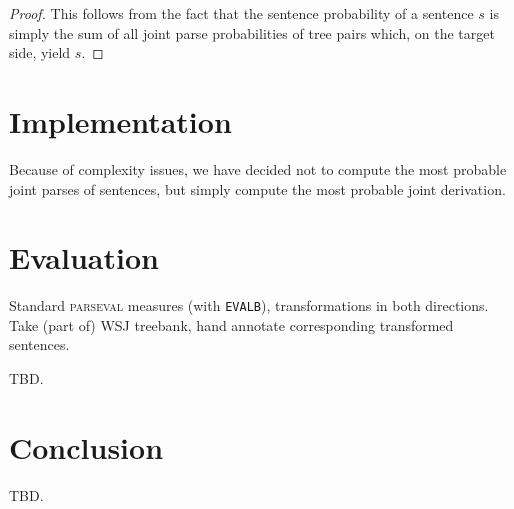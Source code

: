 \documentclass[a4paper]{article}
\theoremstyle{definition}
\begin{document}
\begin{proof}
This follows from the fact that the sentence probability of a sentence $s$ is simply the sum of all joint parse probabilities of tree pairs which, on the target side, yield $s$.
\end{proof}

\section{Implementation}

Because of complexity issues, we have decided not to compute the most probable joint parses of sentences, but simply compute the most probable joint derivation.

\label{sec:implem}

\section{Evaluation}
\label{sec:eval}

Standard \textsc{parseval} measures (with \texttt{EVALB}), transformations in both
directions. Take (part of) WSJ treebank, hand annotate corresponding transformed
sentences.

TBD. 

\section{Conclusion}

TBD.

\label{sec:conc}


%


\end{document}
